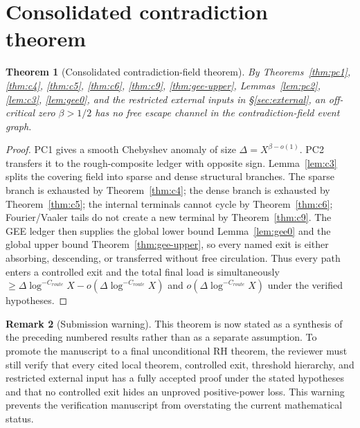 \documentclass[11pt]{article}
\newtheorem{theorem}{Theorem}[section]
\theoremstyle{definition}
\newtheorem{remark}[theorem]{Remark}
\begin{document}
\section{Consolidated contradiction theorem}\label{sec:main}
\begin{theorem}[Consolidated contradiction-field theorem]\label{thm:main}
By Theorems~\ref{thm:pc1}, \ref{thm:c4}, \ref{thm:c5}, \ref{thm:c6}, \ref{thm:c9}, \ref{thm:gee-upper}, Lemmas~\ref{lem:pc2}, \ref{lem:c3}, \ref{lem:gee0}, and the restricted external inputs in \S\ref{sec:external}, an off-critical zero $\beta>1/2$ has no free escape channel in the contradiction-field event graph.
\end{theorem}
\begin{proof}
PC1 gives a smooth Chebyshev anomaly of size $\Delta=X^{\beta-o(1)}$.  PC2 transfers it to the rough-composite ledger with opposite sign.  Lemma~\ref{lem:c3} splits the covering field into sparse and dense structural branches.  The sparse branch is exhausted by Theorem~\ref{thm:c4}; the dense branch is exhausted by Theorem~\ref{thm:c5}; the internal terminals cannot cycle by Theorem~\ref{thm:c6}; Fourier/Vaaler tails do not create a new terminal by Theorem~\ref{thm:c9}.  The GEE ledger then supplies the global lower bound Lemma~\ref{lem:gee0} and the global upper bound Theorem~\ref{thm:gee-upper}, so every named exit is either absorbing, descending, or transferred without free circulation.  Thus every path enters a controlled exit and the total final load is simultaneously $\ge \Delta\log^{-C_{route}}X-o(\Delta\log^{-C_{route}}X)$ and $o(\Delta\log^{-C_{route}}X)$ under the verified hypotheses.
\end{proof}

\begin{remark}[Submission warning]
This theorem is now stated as a synthesis of the preceding numbered results rather than as a separate assumption.  To promote the manuscript to a final unconditional RH theorem, the reviewer must still verify that every cited local theorem, controlled exit, threshold hierarchy, and restricted external input has a fully accepted proof under the stated hypotheses and that no controlled exit hides an unproved positive-power loss.  This warning prevents the verification manuscript from overstating the current mathematical status.
\end{remark}



\end{document}
